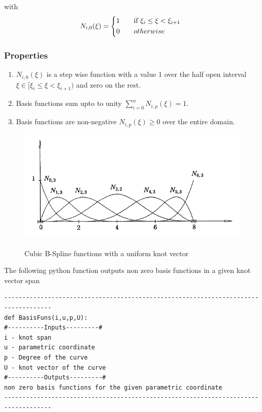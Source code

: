 \documentclass[11pt]{article}
\begin{document}
\noindent
with
\begin{equation}
N_{i,0}(\xi) = 
\begin{cases*}
1 \quad& if $  \xi_{i} \leq \xi<\xi_{i+1} $ \\
0 &  $ otherwise $ \\
\end{cases*}
\end{equation}

\subsubsection{Properties }
\begin{enumerate}
	\item $ N_{i,0}(\xi)$ is a step wise function with a value 1 over the half open interval $ \xi \in [\xi_{i}  \leq \xi<\xi_{i+1}) $ and zero on the rest. 
	\item Basis functions sum upto to unity $\sum_{i=0}^{n} N_{i,p}(\xi) =1$.
	\item Basis functions are non-negative $ N_{i,p}(\xi) \geq 0$ over the entire domain.
\end{enumerate}

\begin{figure}[H]
	\begin{center}
		\includegraphics[scale=0.7]{BSplineBasisFunctions.png}
		\caption{\\Cubic B-Spline functions with a uniform knot vector \cite{piegl2012nurbs}   }\label{BSplineBasisFunctions}
	\end{center}	
\end{figure}
\noindent
The following python function outputs non zero basis functions in a given knot vector span
\begin{verbatim}
-----------------------------------------------------------------------------------
def BasisFuns(i,u,p,U):
#----------Inputs---------#
i - knot span
u - parametric coordinate
p - Degree of the curve
U - knot vector of the curve
#----------Outputs---------#
non zero basis functions for the given parametric coordinate
-----------------------------------------------------------------------------------
\end{verbatim}
\end{document}
